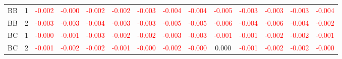 \begin{table}[!htb]
{\begin{tabular}{llcccccccccccc}
BB & 1 & \textcolor{red}{-0.002} & \textcolor{red}{-0.000} & \textcolor{red}{-0.002} & \textcolor{red}{-0.002} & \textcolor{red}{-0.003} & \textcolor{red}{-0.004} & \textcolor{red}{-0.004} & \textcolor{red}{-0.005} & \textcolor{red}{-0.003} & \textcolor{red}{-0.003} & \textcolor{red}{-0.003} & \textcolor{red}{-0.004}\\
BB & 2 & \textcolor{red}{-0.003} & \textcolor{red}{-0.003} & \textcolor{red}{-0.004} & \textcolor{red}{-0.003} & \textcolor{red}{-0.003} & \textcolor{red}{-0.005} & \textcolor{red}{-0.005} & \textcolor{red}{-0.006} & \textcolor{red}{-0.004} & \textcolor{red}{-0.006} & \textcolor{red}{-0.004} & \textcolor{red}{-0.002}\\
BC & 1 & \textcolor{red}{-0.000} & \textcolor{red}{-0.001} & \textcolor{red}{-0.003} & \textcolor{red}{-0.002} & \textcolor{red}{-0.002} & \textcolor{red}{-0.003} & \textcolor{red}{-0.003} & \textcolor{red}{-0.001} & \textcolor{red}{-0.001} & \textcolor{red}{-0.002} & \textcolor{red}{-0.002} & \textcolor{red}{-0.001}\\
BC & 2 & \textcolor{red}{-0.001} & \textcolor{red}{-0.002} & \textcolor{red}{-0.002} & \textcolor{red}{-0.001} & \textcolor{red}{-0.000} & \textcolor{red}{-0.002} & \textcolor{red}{-0.000} & 0.000 & \textcolor{red}{-0.001} & \textcolor{red}{-0.002} & \textcolor{red}{-0.002} & \textcolor{red}{-0.000}\\
\hline
    \end{tabular}%
    }
\end{table}

